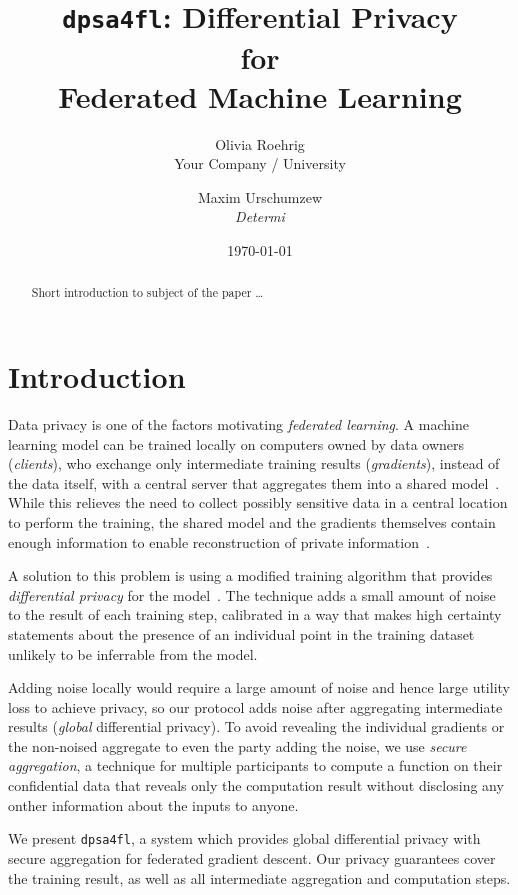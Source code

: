 \documentclass{article}
\title{\texttt{dpsa4fl}: Differential Privacy \\ for \\ Federated Machine Learning}
\author{Olivia Roehrig  \\
	Your Company / University  \\
	\and
	Maxim Urschumzew \\
	\textit{Determi} \\
	}
\date{\today}
\begin{document}
\maketitle


\begin{abstract}
Short introduction to subject of the paper \ldots 
\end{abstract}

\section{Introduction}
Data privacy is one of the factors motivating \emph{federated learning}. A machine learning model can be trained locally on computers owned by data owners (\emph{clients}), who exchange only intermediate training results (\emph{gradients}), instead of the data itself, with a central server that aggregates them into a shared model~\cite{McMahan2016CommunicationEfficientLO}. While this relieves the need to collect possibly sensitive data in a central location to perform the training, the shared model and the gradients themselves contain enough information to enable reconstruction of private information~\cite{7958568}\cite{Boenisch2021WhenTC}.

A solution to this problem is using a modified training algorithm that provides \emph{differential privacy} for the model~\cite{Abadi_2016}. The technique adds a small amount of noise to the result of each training step, calibrated in a way that makes high certainty statements about the presence of an individual point in the training dataset unlikely to be inferrable from the model.

Adding noise locally would require a large amount of noise and hence large utility loss to achieve privacy, so our protocol adds noise after aggregating intermediate results (\emph{global} differential privacy). To avoid revealing the individual gradients or the non-noised aggregate to even the party adding the noise, we use \emph{secure aggregation}, a technique for multiple participants to compute a function on their confidential data that reveals only the computation result without disclosing any onther information about the inputs to anyone.

We present \texttt{dpsa4fl}, a system which provides global differential privacy with
secure aggregation for federated gradient descent. Our privacy guarantees cover the training result,
as well as all intermediate aggregation and computation steps.
\end{document}
